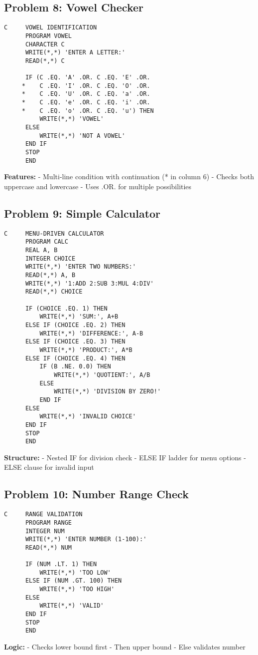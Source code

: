 \documentclass{book}
\begin{document}
\subsection*{Problem 8: Vowel Checker}
\begin{verbatim}
C     VOWEL IDENTIFICATION
      PROGRAM VOWEL
      CHARACTER C
      WRITE(*,*) 'ENTER A LETTER:'
      READ(*,*) C
      
      IF (C .EQ. 'A' .OR. C .EQ. 'E' .OR. 
     *    C .EQ. 'I' .OR. C .EQ. 'O' .OR.
     *    C .EQ. 'U' .OR. C .EQ. 'a' .OR.
     *    C .EQ. 'e' .OR. C .EQ. 'i' .OR.
     *    C .EQ. 'o' .OR. C .EQ. 'u') THEN
          WRITE(*,*) 'VOWEL'
      ELSE
          WRITE(*,*) 'NOT A VOWEL'
      END IF
      STOP
      END
\end{verbatim}
\textbf{Features:}
- Multi-line condition with continuation (* in column 6)
- Checks both uppercase and lowercase
- Uses .OR. for multiple possibilities

\subsection*{Problem 9: Simple Calculator}
\begin{verbatim}
C     MENU-DRIVEN CALCULATOR
      PROGRAM CALC
      REAL A, B
      INTEGER CHOICE
      WRITE(*,*) 'ENTER TWO NUMBERS:'
      READ(*,*) A, B
      WRITE(*,*) '1:ADD 2:SUB 3:MUL 4:DIV'
      READ(*,*) CHOICE
      
      IF (CHOICE .EQ. 1) THEN
          WRITE(*,*) 'SUM:', A+B
      ELSE IF (CHOICE .EQ. 2) THEN
          WRITE(*,*) 'DIFFERENCE:', A-B
      ELSE IF (CHOICE .EQ. 3) THEN
          WRITE(*,*) 'PRODUCT:', A*B
      ELSE IF (CHOICE .EQ. 4) THEN
          IF (B .NE. 0.0) THEN
              WRITE(*,*) 'QUOTIENT:', A/B
          ELSE
              WRITE(*,*) 'DIVISION BY ZERO!'
          END IF
      ELSE
          WRITE(*,*) 'INVALID CHOICE'
      END IF
      STOP
      END
\end{verbatim}
\textbf{Structure:}
- Nested IF for division check
- ELSE IF ladder for menu options
- ELSE clause for invalid input

\subsection*{Problem 10: Number Range Check}
\begin{verbatim}
C     RANGE VALIDATION
      PROGRAM RANGE
      INTEGER NUM
      WRITE(*,*) 'ENTER NUMBER (1-100):'
      READ(*,*) NUM
      
      IF (NUM .LT. 1) THEN
          WRITE(*,*) 'TOO LOW'
      ELSE IF (NUM .GT. 100) THEN
          WRITE(*,*) 'TOO HIGH'
      ELSE
          WRITE(*,*) 'VALID'
      END IF
      STOP
      END
\end{verbatim}
\textbf{Logic:}
- Checks lower bound first
- Then upper bound
- Else validates number
\end{document}
